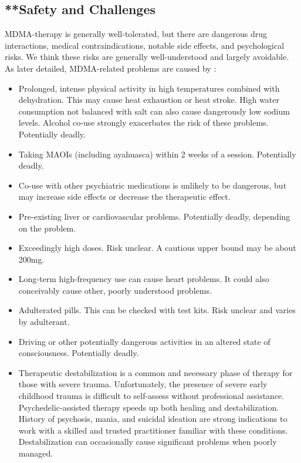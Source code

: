 \documentclass[12pt,letterpaper]{article}
\begin{document}
\subsection{**Safety and Challenges}
\label{sec:safety}
MDMA-therapy is generally well-tolerated, but there are dangerous drug interactions, medical contraindications, notable side effects, and psychological risks. We think these risks are generally well-understood and largely avoidable. As later detailed, MDMA-related problems are caused by \cite{riggDeaths,roxburghDeaths}:
\begin{itemize}
    \item Prolonged, intense physical activity in high temperatures combined with dehydration. This may cause heat exhaustion or heat stroke. High water consumption not balanced with salt can also cause dangerously low sodium levels. Alcohol co-use strongly exacerbates the risk of these problems. Potentially deadly.
    \item Taking MAOIs (including ayahuasca) within 2 weeks of a session. Potentially deadly.
    \item Co-use with other psychiatric medications is unlikely to be dangerous, but may increase side effects or decrease the therapeutic effect.
    \item Pre-existing liver or cardiovascular problems. Potentially deadly, depending on the problem.
    \item Exceedingly high doses. Risk unclear. A cautious upper bound may be about 200mg.
    \item Long-term high-frequency use can cause heart problems. It could also conceivably cause other, poorly understood problems.
    \item Adulterated pills. This can be checked with test kits. Risk unclear and varies by adulterant.
    \item Driving or other potentially dangerous activities in an altered state of consciousness. Potentially deadly.
    \item Therapeutic destabilization is a common and necessary phase of therapy for those with severe trauma. Unfortunately, the presence of severe early childhood trauma is difficult to self-assess without professional assistance. Psychedelic-assisted therapy speeds up both healing and destabilization. History of psychosis, mania, and suicidal ideation are strong indications to work with a skilled and trusted practitioner familiar with these conditions. Destabilization can occasionally cause significant problems when poorly managed.
\end{itemize}
\end{document}
